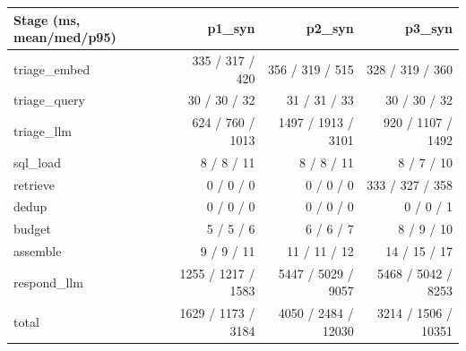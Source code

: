 \begin{tabular}{lrrr}
\toprule
Stage (ms, mean/med/p95) & p1\_syn & p2\_syn & p3\_syn \\
\midrule
triage\_embed & 335 / 317 / 420 & 356 / 319 / 515 & 328 / 319 / 360 \\
triage\_query & 30 / 30 / 32 & 31 / 31 / 33 & 30 / 30 / 32 \\
triage\_llm & 624 / 760 / 1013 & 1497 / 1913 / 3101 & 920 / 1107 / 1492 \\
sql\_load & 8 / 8 / 11 & 8 / 8 / 11 & 8 / 7 / 10 \\
retrieve & 0 / 0 / 0 & 0 / 0 / 0 & 333 / 327 / 358 \\
dedup & 0 / 0 / 0 & 0 / 0 / 0 & 0 / 0 / 1 \\
budget & 5 / 5 / 6 & 6 / 6 / 7 & 8 / 9 / 10 \\
assemble & 9 / 9 / 11 & 11 / 11 / 12 & 14 / 15 / 17 \\
respond\_llm & 1255 / 1217 / 1583 & 5447 / 5029 / 9057 & 5468 / 5042 / 8253 \\
total & 1629 / 1173 / 3184 & 4050 / 2484 / 12030 & 3214 / 1506 / 10351 \\
\bottomrule
\end{tabular}
